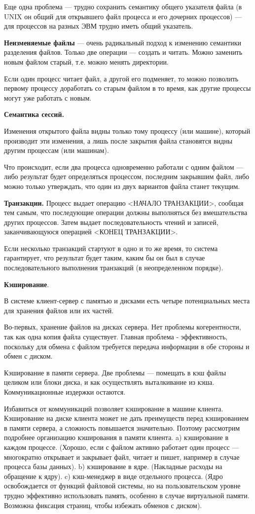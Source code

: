 Еще одна проблема --- трудно сохранить семантику общего указателя файла (в UNIX он общий для открывшего файл процесса и его дочерних процессов) --- для процессов на разных ЭВМ трудно иметь общий указатель.

\textbf{Неизменяемые файлы} --- очень радикальный подход к изменению семантики разделения файлов. 
Только две операции --- создать и читать. 
Можно заменить новым файлом старый, т.е. можно менять директории. 

Если один процесс читает файл, а другой его подменяет, то можно позволить первому процессу доработать со старым файлом в то время, как другие процессы могут уже работать с новым.

\textbf{Семантика сессий.}

Изменения открытого файла видны только тому процессу (или машине), который производит эти изменения, а лишь после закрытия файла становятся видны другим процессам (или машинам). 

Что происходит, если два процесса одновременно работали с одним файлом --- либо результат будет определяться процессом, последним закрывшим файл, либо можно только утверждать, что один из двух вариантов файла станет текущим.

\textbf{Транзакции.}
Процесс выдает операцию <НАЧАЛО ТРАНЗАКЦИИ>, сообщая тем самым, что последующие операции должны выполняться без вмешательства других процессов.
Затем выдает последовательность чтений и записей, заканчивающуюся операцией <КОНЕЦ ТРАНЗАКЦИИ>. 

Если несколько транзакций стартуют в одно и то же время, то система гарантирует, что результат будет таким, каким бы он был в случае последовательного выполнения транзакций (в неопределенном порядке).

\textbf{Кэширование}. 

В системе клиент-сервер с памятью и дисками есть четыре потенциальных места для хранения файлов или их частей. 

Во-первых, хранение файлов на дисках сервера. 
Нет проблемы когерентности, так как одна копия файла существует. 
Главная проблема - эффективность, поскольку для обмена с файлом требуется передача информации в обе стороны и обмен с диском. 

Кэширование в памяти сервера. 
Две проблемы --- помещать в кэш файлы целиком или блоки диска, и как осуществлять выталкивание из кэша. 
Коммуникационные издержки остаются. 

Избавиться от коммуникаций позволяет кэширование в машине клиента. 
Кэширование на диске клиента может не дать преимуществ перед кэшированием в памяти сервера, а сложность повышается значительно. 
Поэтому рассмотрим подробнее организацию кэширования в памяти клиента. 
a) кэширование в каждом процессе. (Хорошо, если с файлом активно работает один процесс --- многократно открывает и закрывает файл, читает и пишет, например в случае процесса базы данных). 
b) кэширование в ядре. (Накладные расходы на обращение к ядру). 
c) кэш-менеджер в виде отдельного процесса. (Ядро освобождается от функций файловой системы, но на пользовательском уровне трудно эффективно использовать память, особенно в случае виртуальной памяти. Возможна фиксация страниц, чтобы избежать обменов с диском). 

